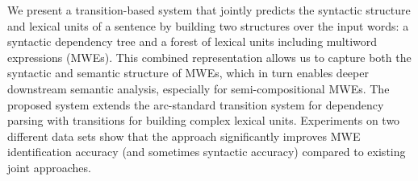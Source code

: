 We present a transition-based system that jointly predicts the syntactic structure and lexical units of a sentence by building two structures over the input words: a syntactic dependency tree and a forest of lexical units including multiword expressions (MWEs). This combined representation allows us to capture both the syntactic and semantic structure of MWEs, which in turn enables deeper downstream semantic analysis, especially for semi-compositional MWEs. The proposed system extends the arc-standard transition system for dependency parsing with transitions for building complex lexical units. Experiments on two different data sets show that the approach significantly improves MWE identification accuracy (and sometimes syntactic accuracy) compared to existing joint approaches.
